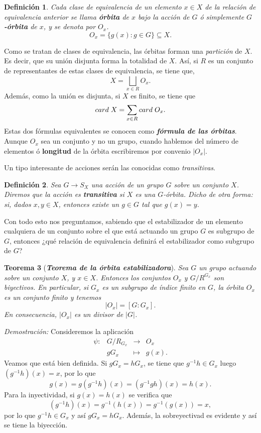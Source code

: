 \documentclass[12pt]{article}
\newtheorem{theorem}{Teorema}[section]
\newtheorem{definition}[theorem]{Definición}
\begin{document}
\begin{definition} Cada clase de equivalencia de un elemento $x \in X$ de la relación de equivalencia anterior se llama \textbf{órbita} de $x$ bajo la acción de $G$ ó simplemente \textbf{$G$-órbita} de $x$, y se denota por $O_{x}$. $$O_{x} = \lbrace g(x) : g\in G \rbrace \subseteq X.$$ 
\end{definition}

Como se tratan de clases de equivalencia, las órbitas forman una \textit{partición} de $X$. Es decir, que su unión disjunta forma la totalidad de $X$. Así, si $R$ es un conjunto de representantes de estas clases de equivalencia, se tiene que, $$X = \bigsqcup_{x \in R} O_{x}.$$ Además, como la unión es disjunta, si $X$ es finito, se tiene que $$card \hspace{0.1cm} X = \sum_{x\in R} card\hspace{0.1cm} O_{x}.$$ Estas dos fórmulas equivalentes se conocen como \textit{\textbf{fórmula de las órbitas}}. Aunque $O_{x}$ sea un conjunto y no un grupo, cuando hablemos del número de elementos ó \textbf{longitud} de la órbita escribiremos por convenio $|O_{x}|$.

Un tipo interesante de acciones serán las conocidas como \textit{transitivas}.

\begin{definition}Sea $G \longrightarrow S_X$ una acción de un grupo $G$ sobre un conjunto $X$. Diremos que la acción es \textbf{transitiva} si $X$ es una $G$-órbita. Dicho de otra forma: si, dados $x,y \in X$, entonces existe un $g \in G$ tal que $g(x)=y$.
\end{definition}

Con todo esto nos preguntamos, sabiendo que el estabilizador de un elemento cualquiera de un conjunto sobre el que está actuando un grupo $G$ es subgrupo de $G$, entonces ¿qué relación de equivalencia definirá el estabilizador como subgrupo de $G$?

\begin{theorem}[\textit{\textbf{Teorema de la órbita estabilizadora}}]\label{eq:torest}
Sea $G$ un grupo actuando sobre un conjunto $X$, y $x \in X$. Entonces los conjuntos $O_{x}$ y $G/R^{G_{x}}$ son biyectivos.
En particular, si $G_{x}$ es un subgrupo de índice finito en $G$, la órbita $O_{x}$ es un conjunto finito y tenemos $$|O_{x}| = \left[ G:G_{x} \right].$$ En consecuencia, $|O_{x}|$ es un divisor de $|G|$.
\end{theorem}
\emph{Demostración: }Consideremos la aplicación $$\begin{array}{rccl}
\psi\colon &G/R_{G_{x}}& \longrightarrow &O_{x}\\
&gG_{x}& \longmapsto &g(x).
\end{array}
$$ Veamos que está bien definida. Si $gG_{x} = hG_{x}$, se tiene que $g^{-1}h \in G_{x}$ luego $(g^{-1}h)(x) = x$, por lo que $$g(x) = g(g^{-1}h)(x) = (g^{-1}gh)(x) = h(x).$$ 
Para la inyectividad, si $g(x) = h(x)$ se verifica que $$(g^{-1}h)(x) = g^{-1}(h(x)) = g^{-1}(g(x)) = x,$$ por lo que $g^{-1}h \in G_{x}$ y así $gG_{x} = hG_{x}$. Además, la sobreyectivad es evidente y así se tiene la biyección.
\end{document}
